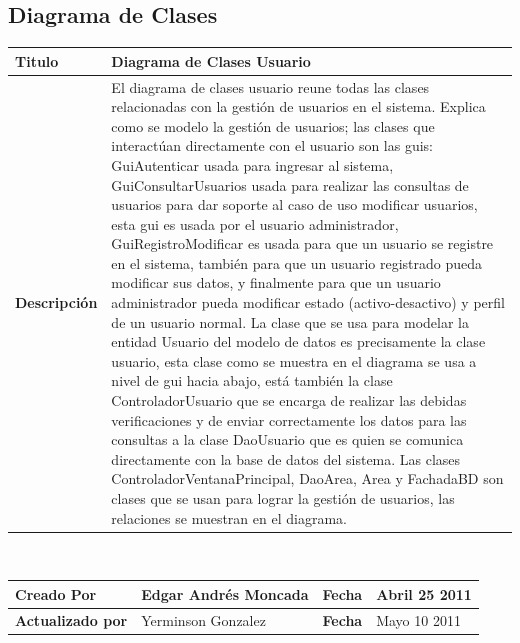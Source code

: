 %
%

\subsection{Diagrama de Clases}
				
	\begin{tabular}{|p{5cm}|p{11cm}|}\hline
	{\bf Titulo} & {Diagrama de Clases Usuario}\\
	\hline
	{\bf Descripción} & {El diagrama de clases usuario reune todas las clases
	relacionadas con la gestión de usuarios en el sistema.\newline
	Explica como se modelo la gestión de usuarios; las clases que interactúan 
	directamente con el usuario	son las guis: GuiAutenticar usada para ingresar
	al sistema, GuiConsultarUsuarios usada para realizar las consultas de usuarios
	para dar soporte al caso de uso modificar usuarios, esta gui es usada por el usuario
	administrador, GuiRegistroModificar es usada para que un usuario se registre
	en el sistema, también para que un usuario registrado pueda modificar sus datos, y
	finalmente para que un usuario administrador pueda modificar estado (activo-desactivo) y
	perfil de un usuario normal. \newline
	La clase que se usa para modelar la entidad Usuario del modelo de datos es precisamente
	la clase usuario, esta clase como se muestra en el diagrama se usa a nivel de gui hacia
	abajo, está también la clase ControladorUsuario que se encarga de realizar las debidas
	verificaciones y de enviar correctamente los datos para las consultas a la clase DaoUsuario 
	que es quien se comunica directamente con la base de datos del sistema.\newline
	Las clases ControladorVentanaPrincipal, DaoArea, Area y FachadaBD son clases que se usan para 
	lograr la gestión de usuarios, las relaciones se muestran en el diagrama.}\\
	\hline
	\end{tabular}\\[.5cm]
		
	\begin{tabular}{|p{3.5cm}|p{4.5cm}|p{2.5cm}|p{4.5cm}|}\hline
	{\bf Creado Por} & {Edgar Andrés Moncada} & {\bf Fecha} & {Abril 25 2011}\\
	\hline
	{\bf Actualizado por} & {Yerminson Gonzalez} & {\bf Fecha} & {Mayo 10 2011}\\
	\hline
	\end{tabular}

